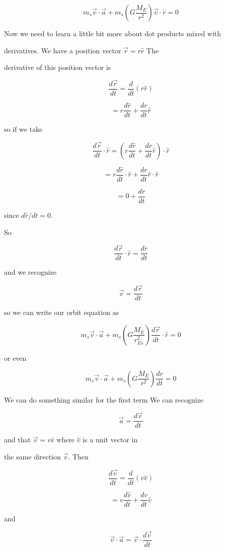 $$m_{s}\overrightarrow{v}\cdot \overrightarrow{a}+m_{s}\left( G\frac{M_{E}}{r^{2}}\right) \overrightarrow{v}\cdot \hat{r}=0 $$

Now we need to learn a little bit more about dot products mixed with

derivatives. We have a position vector $\overrightarrow{r}=r\hat{r}$ The

derivative of this position vector is 

$$\frac{d\overrightarrow{r}}{dt}=\frac{d}{dt}\left( r\hat{r}\right) $$

$$=r\frac{d\hat{r}}{dt}+\frac{dr}{dt}\hat{r}$$


so if we take 

$$\frac{d\overrightarrow{r}}{dt}\cdot \hat{r}=\left( r\frac{d\hat{r}}{dt}+\frac{dr}{dt}\hat{r}\right) \cdot \hat{r}$$


$$=r\frac{d\hat{r}}{dt}\cdot \hat{r}+\frac{dr}{dt}\hat{r}\cdot \hat{r}$$%

$$=0+\frac{dr}{dt}$$%

since $d\hat{r}/dt=0.$


So 

$$\frac{d\overrightarrow{r}}{dt}\cdot \hat{r}=\frac{dr}{dt}$$

and we recognize 

$$\overrightarrow{v}=\frac{d\overrightarrow{r}}{dt}$$

so we can write our orbit equation as%

$$m_{s}\overrightarrow{v}\cdot \overrightarrow{a}+m_{s}\left( G\frac{M_{E}}{r_{Es}^{2}}\right) \frac{d\overrightarrow{r}}{dt}\cdot \hat{r}=0$$

or even 

$$m_{s}\overrightarrow{v}\cdot \overrightarrow{a}+m_{s}\left( G\frac{M_{E}}{r^{2}}\right) \frac{dr}{dt}=0$$

We can do something similar for the first term We can recognize 

$$\overrightarrow{a}=\frac{d\overrightarrow{v}}{dt}$$

and that $\overrightarrow{v}=v\hat{v}$ where $\hat{v}$ is a unit vector in

the same direction $\overrightarrow{v}.$ Then 

$$\frac{d\overrightarrow{v}}{dt}=\frac{d}{dt}\left( v\hat{v}\right) $$

$$=v\frac{d\hat{v}}{dt}+\frac{dv}{dt}\hat{v}$$

and 

$$\overrightarrow{v}\cdot \overrightarrow{a}=\overrightarrow{v}\cdot \frac{d\overrightarrow{v}}{dt}$$

